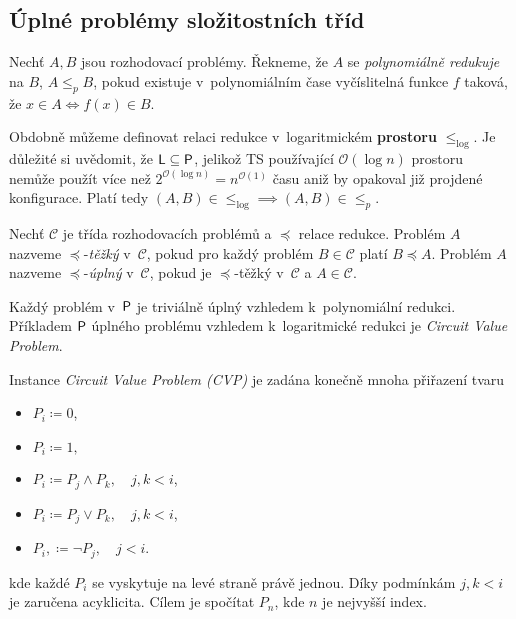 \subsection{Úplné problémy složitostních tříd}

\begin{definition}
    Nechť $A, B$ jsou rozhodovací problémy.
    Řekneme, že $A$ se {\em polynomiálně redukuje} na $B$,
    $A \leq_p B$, pokud existuje v~polynomiálním čase vyčíslitelná
    funkce $f$ taková, že $x \in A \iff f(x) \in B$.
\end{definition}

Obdobně můžeme definovat relaci redukce v~logaritmickém {\bf prostoru}
$\leq_{\log}$. Je důležité si uvědomit, že $\L \subseteq \P$,
jelikož TS používající $\mathcal{O}(\log n)$ prostoru nemůže
použít více než $2^{\mathcal{O}(\log n)} = n^{\mathcal{O}(1)}$ času
aniž by opakoval již projdené konfigurace. Platí tedy
$(A,B) \in {\leq_{\log}} \implies (A,B) \in {\leq_p}$.

\begin{definition}
    Nechť $\mathcal{C}$ je třída rozhodovacích problémů
    a $\preceq$ relace redukce.
    Problém $A$ nazveme $\preceq$-{\em těžký} v~$\mathcal{C}$,
    pokud pro každý problém $B \in \mathcal{C}$
    platí $B \preceq A$.
    Problém $A$ nazveme $\preceq$-{\em úplný} v~$\mathcal{C}$, pokud je
    $\preceq$-těžký v~$\mathcal{C}$ a $A \in \mathcal{C}$.
\end{definition}

Každý problém v~$\P$ je triviálně úplný vzhledem k~polynomiální redukci.
Příkladem $\P$ úplného problému vzhledem k~logaritmické redukci je
{\em Circuit Value Problem}.

\begin{definition}
    Instance {\em Circuit Value Problem (CVP)}
    je zadána konečně mnoha přiřazení tvaru
    \begin{itemize}
        \item $P_i \coloneqq 0$,
        \item $P_i \coloneqq 1,$
        \item $P_i \coloneqq P_j \land P_k, \quad j, k < i$,
        \item $P_i \coloneqq P_j \lor P_k, \quad j, k < i$,
        \item $P_i, \coloneqq \neg P_j, \quad j < i$.
    \end{itemize}
    kde každé $P_i$ se vyskytuje na levé straně právě jednou. Díky
    podmínkám $j,k < i$ je zaručena acyklicita. Cílem je spočítat $P_n$,
    kde $n$ je nejvyšší index.
\end{definition}

